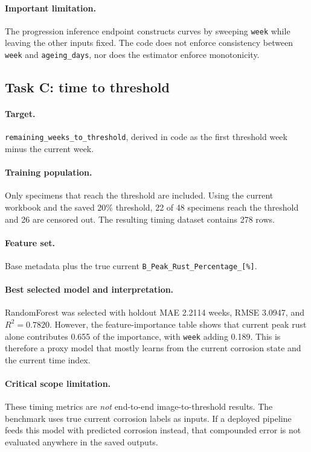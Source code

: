 \documentclass[11pt]{article}
\begin{document}
\paragraph{Important limitation.}
The progression inference endpoint constructs curves by sweeping \texttt{week} while leaving the other inputs fixed. The code does not enforce consistency between \texttt{week} and \texttt{ageing\_days}, nor does the estimator enforce monotonicity.

\subsection{Task C: time to threshold}
\paragraph{Target.}
\texttt{remaining\_weeks\_to\_threshold}, derived in code as the first threshold week minus the current week.

\paragraph{Training population.}
Only specimens that reach the threshold are included. Using the current workbook and the saved 20\% threshold, 22 of 48 specimens reach the threshold and 26 are censored out. The resulting timing dataset contains 278 rows.

\paragraph{Feature set.}
Base metadata plus the true current \texttt{B\_Peak\_Rust\_Percentage\_[\%]}.

\paragraph{Best selected model and interpretation.}
RandomForest was selected with holdout MAE 2.2114 weeks, RMSE 3.0947, and \(R^2=0.7820\). However, the feature-importance table shows that current peak rust alone contributes 0.655 of the importance, with \texttt{week} adding 0.189. This is therefore a proxy model that mostly learns from the current corrosion state and the current time index.

\paragraph{Critical scope limitation.}
These timing metrics are \emph{not} end-to-end image-to-threshold results. The benchmark uses true current corrosion labels as inputs. If a deployed pipeline feeds this model with predicted corrosion instead, that compounded error is not evaluated anywhere in the saved outputs.
\end{document}
